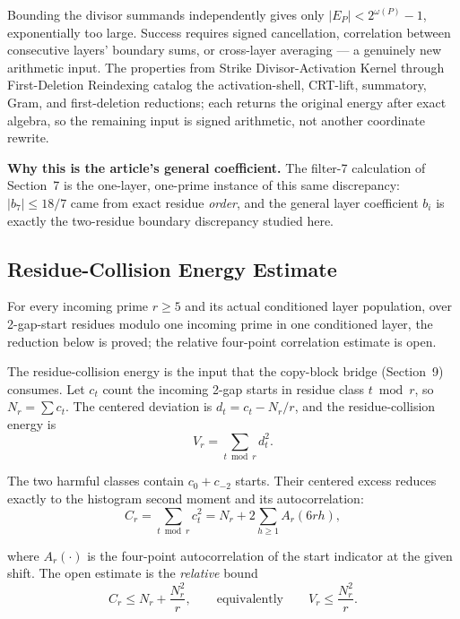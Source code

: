 Bounding the divisor summands independently gives only
$|E_P|\lt2^{\omega(P)}-1$, exponentially too large. Success requires signed
cancellation, correlation between consecutive layers' boundary sums, or
cross-layer averaging --- a genuinely new arithmetic input. The properties from Strike Divisor-Activation Kernel through First-Deletion Reindexing
catalog the activation-shell, CRT-lift, summatory, Gram, and first-deletion
reductions; each returns the original energy after exact algebra, so the
remaining input is signed arithmetic, not another coordinate rewrite.

\textbf{Why this is the article's general coefficient.} The filter-7 calculation
of Section~7 is the one-layer, one-prime instance of this same discrepancy:
$|b_7|\le18/7$ came from exact residue \emph{order}, and the general layer
coefficient $b_i$ is exactly the two-residue boundary discrepancy studied
here. 

\subsection{Residue-Collision Energy Estimate}
\label{sec:residue-collision-energy}

For every incoming prime $r\ge5$ and its actual conditioned layer population,
over 2-gap-start residues modulo one incoming prime in one conditioned layer,
the reduction below is proved; the relative four-point correlation estimate
is open.

The residue-collision energy is the input that the copy-block bridge (Section~9)
consumes. Let
$c_t$ count the incoming 2-gap starts in residue class $t\bmod r$, so
$N_r=\sum c_t$. The centered deviation is $d_t=c_t-N_r/r$, and the
residue-collision energy is
\begin{equation*}
V_r=\sum_{t\bmod r}d_t^2.
\end{equation*}

The two harmful classes contain $c_0+c_{-2}$ starts. Their centered excess
reduces exactly to the histogram second moment and its autocorrelation:
\begin{equation*}
C_r
=
\sum_{t\bmod r}c_t^2
=
N_r+2\sum_{h\ge1}A_r(6rh),
\end{equation*}

where $A_r(\cdot)$ is the four-point autocorrelation of the start indicator
at the given shift. The open estimate is the \emph{relative} bound
\begin{equation*}
C_r\le N_r+\frac{N_r^2}{r},
\qquad\text{equivalently}\qquad
V_r\le\frac{N_r^2}{r}.
\end{equation*}

